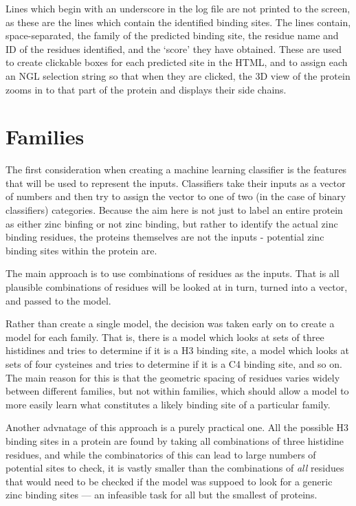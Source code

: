Lines which begin with an underscore in the log file are not printed to the screen, as these are the lines which contain the identified binding sites. The lines contain, space-separated, the family of the predicted binding site, the residue name and ID of the residues identified, and the `score' they have obtained. These are used to create clickable boxes for each predicted site in the HTML, and to assign each an NGL selection string so that when they are clicked, the 3D view of the protein zooms in to that part of the protein and displays their side chains.




\section{Families}

The first consideration when creating a machine learning classifier is the features that will be used to represent the inputs. Classifiers take their inputs as a vector of numbers and then try to assign the vector to one of two (in the case of binary classifiers) categories. Because the aim here is not just to label an entire protein as either zinc binfing or not zinc binding, but rather to identify the actual zinc binding residues, the proteins themselves are not the inputs - potential zinc binding sites within the protein are.

The main approach is to use combinations of residues as the inputs. That is all plausible combinations of residues will be looked at in turn, turned into a vector, and passed to the model.

Rather than create a single model, the decision was taken early on to create a model for each family. That is, there is a model which looks at sets of three histidines and tries to determine if it is a H3 binding site, a model which looks at sets of four cysteines and tries to determine if it is a C4 binding site, and so on. The main reason for this is that the geometric spacing of residues varies widely between different families, but not within families, which should allow a model to more easily learn what constitutes a likely binding site of a particular family. 

Another advnatage of this approach is a purely practical one. All the possible H3 binding sites in a protein are found by taking all combinations of three histidine residues, and while the combinatorics of this can lead to large numbers of potential sites to check, it is vastly smaller than the combinations of \emph{all} residues that would need to be checked if the model was suppoed to look for a generic zinc binding sites --- an infeasible task for all but the smallest of proteins.

